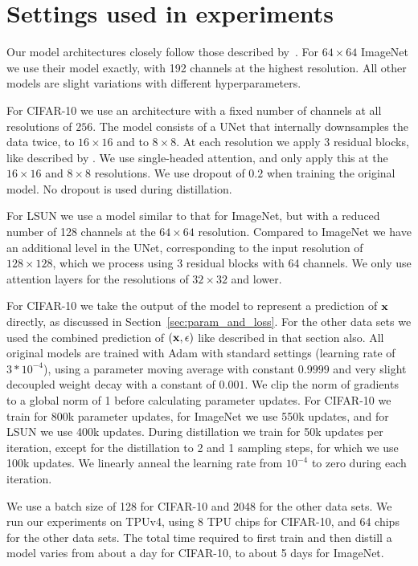 \documentclass[hidelinks]{article} %
\begin{document}
\section{Settings used in experiments}
\label{app:experiment_details}
Our model architectures closely follow those described by~\cite{dhariwal2021diffusion}. For $64\times64$ ImageNet we use their model exactly, with 192 channels at the highest resolution. All other models are slight variations with different hyperparameters.

For CIFAR-10 we use an architecture with a fixed number of channels at all resolutions of $256$. The model consists of a UNet that internally downsamples the data twice, to $16\times16$ and to $8\times8$. At each resolution we apply 3 residual blocks, like described by \cite{dhariwal2021diffusion}. We use single-headed attention, and only apply this at the $16\times16$ and $8\times8$ resolutions. We use dropout of $0.2$ when training the original model. No dropout is used during distillation.

For LSUN we use a model similar to that for ImageNet, but with a reduced number of 128 channels at the $64\times64$ resolution. Compared to ImageNet we have an additional level in the UNet, corresponding to the input resolution of $128\times 128$, which we process using 3 residual blocks with 64 channels. We only use attention layers for the resolutions of $32 \times 32$ and lower.

For CIFAR-10 we take the output of the model to represent a prediction of ${\mathbf{x}}$ directly, as discussed in Section~\ref{sec:param_and_loss}. For the other data sets we used the combined prediction of $({\mathbf{x}}, {\mathbf{\epsilon}})$ like described in that section also. All original models are trained with Adam with standard settings (learning rate of $3*10^{-4}$), using a parameter moving average with constant $0.9999$ and very slight decoupled weight decay \citep{loshchilov2017decoupled} with a constant of $0.001$. We clip the norm of gradients to a global norm of 1 before calculating parameter updates. For CIFAR-10 we train for 800k parameter updates, for ImageNet we use 550k updates, and for LSUN we use 400k updates. During distillation we train for 50k updates per iteration, except for the distillation to 2 and 1 sampling steps, for which we use 100k updates. We linearly anneal the learning rate from $10^{-4}$ to zero during each iteration.

We use a batch size of 128 for CIFAR-10 and 2048 for the other data sets. We run our experiments on TPUv4, using 8 TPU chips for CIFAR-10, and 64 chips for the other data sets. The total time required to first train and then distill a model varies from about a day for CIFAR-10, to about 5 days for ImageNet.
\end{document}
